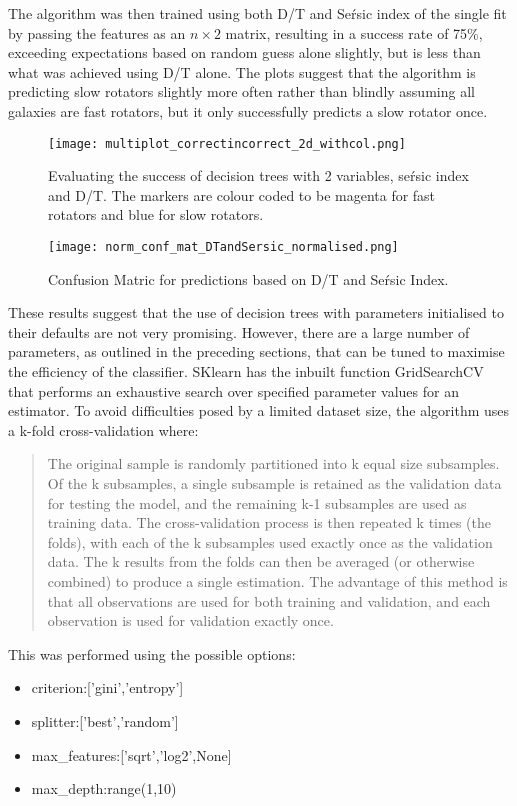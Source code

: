 The algorithm was then trained using both D/T and Se\'rsic index of the single fit by passing the features as an $n\times 2$ matrix, resulting in a success rate of 75\%, exceeding expectations based on random guess alone slightly, but is less than what was achieved using D/T alone. The plots suggest that the algorithm is predicting slow rotators slightly more often rather than blindly assuming all galaxies are fast rotators, but it only successfully predicts a slow rotator once.
\begin{figure}[h!]
	\centering
	\texttt{[image: multiplot\_correctincorrect\_2d\_withcol.png]}
	\caption{Evaluating the success of decision trees with 2 variables, se\'rsic index and D/T. The markers are colour coded to be magenta for fast rotators and blue for slow rotators.
	}
	\label{fig:correctvsincorrect}
\end{figure}
\begin{figure}[h!]
	\centering
	\texttt{[image: norm\_conf\_mat\_DTandSersic\_normalised.png]}
	\caption{Confusion Matric for predictions based on D/T and Se\'rsic Index.
	}
	\label{fig:confmatDT}
\end{figure}
These results suggest that the use of decision trees with parameters initialised to their defaults are not very promising. However, there are a large number of parameters, as outlined in the preceding sections, that can be tuned to maximise the efficiency of the classifier. SKlearn has the inbuilt function GridSearchCV that performs an exhaustive search over specified parameter values for an estimator. To avoid difficulties posed by a limited dataset size, the algorithm uses a k-fold cross-validation where:
\begin{quotation}
	The original sample is randomly partitioned into k equal size subsamples. Of the k subsamples, a single subsample is retained as the validation data for testing the model, and the remaining k-1 subsamples are used as training data. The cross-validation process is then repeated k times (the folds), with each of the k subsamples used exactly once as the validation data. The k results from the folds can then be averaged (or otherwise combined) to produce a single estimation. The advantage of this method is that all observations are used for both training and validation, and each observation is used for validation exactly once.\cite{vanschoren}
\end{quotation}
This was performed using the possible options:
\begin{itemize}
	\item criterion:['gini','entropy']
	\item splitter:['best','random']
	\item max\_features:['sqrt','log2',None]
	\item max\_depth:range(1,10)
\end{itemize}
